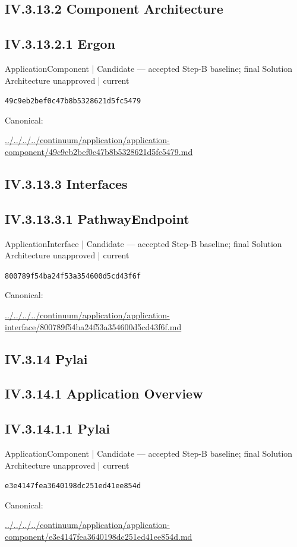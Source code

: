 \documentclass[10pt,a4paper]{article}
\begin{document}
\subsection*{IV.3.13.2 Component Architecture}
\subsection*{IV.3.13.2.1 Ergon}
\label{element-49c9eb2bef0c47b8b5328621d5fc5479}
{\small ApplicationComponent | Candidate — accepted Step-B baseline; final Solution Architecture unapproved | current}\par
\texttt{49c9eb2bef0c47b8b5328621d5fc5479}\par
Canonical: \par
{\footnotesize\url{../../../../continuum/application/application-component/49c9eb2bef0c47b8b5328621d5fc5479.md}}\par
\subsection*{IV.3.13.3 Interfaces}
\subsection*{IV.3.13.3.1 PathwayEndpoint}
\label{element-800789f54ba24f53a354600d5cd43f6f}
{\small ApplicationInterface | Candidate — accepted Step-B baseline; final Solution Architecture unapproved | current}\par
\texttt{800789f54ba24f53a354600d5cd43f6f}\par
Canonical: \par
{\footnotesize\url{../../../../continuum/application/application-interface/800789f54ba24f53a354600d5cd43f6f.md}}\par
\subsection*{IV.3.14 Pylai}
\subsection*{IV.3.14.1 Application Overview}
\subsection*{IV.3.14.1.1 Pylai}
\label{element-e3e4147fea3640198dc251ed41ee854d}
{\small ApplicationComponent | Candidate — accepted Step-B baseline; final Solution Architecture unapproved | current}\par
\texttt{e3e4147fea3640198dc251ed41ee854d}\par
Canonical: \par
{\footnotesize\url{../../../../continuum/application/application-component/e3e4147fea3640198dc251ed41ee854d.md}}\par
\end{document}
